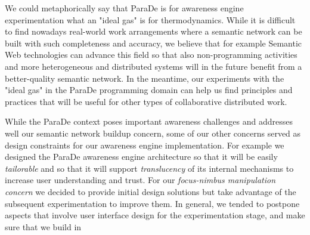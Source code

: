\documentclass{ecscw2007}
\begin{document}
We could metaphorically say that ParaDe is for awareness engine experimentation what an "ideal gas" is for thermodynamics. While it is difficult to find nowadays real-world work arrangements where a semantic network can be built with such completeness and accuracy, we believe that for example Semantic Web technologies can advance this field so that also non-programming activities and more heterogeneous and distributed systems will in the future benefit from a better-quality semantic network. In the meantime, our experiments with the "ideal gas" in the ParaDe programming domain can help us find principles and practices that will be useful for other types of collaborative distributed work.

While the ParaDe context poses important awareness challenges and addresses well our semantic network buildup concern, some of our other concerns served as design constraints for our awareness engine implementation. For example we designed the ParaDe awareness engine architecture so that it will be easily \textit{tailorable} and so that it will support \textit{translucency} of its internal mechanisms to increase user understanding and trust. For our \textit{focus-nimbus manipulation concern} we decided to provide initial design solutions but take advantage of the subsequent experimentation to improve them. In general, we tended to postpone aspects that involve user interface design for the experimentation stage, and make sure that we build in 
\end{document}
